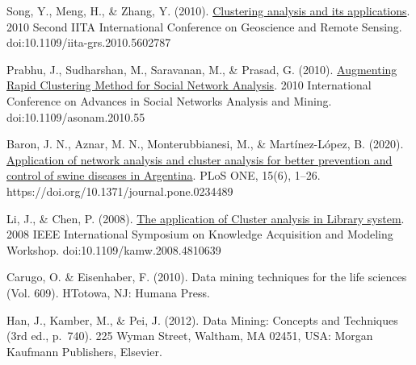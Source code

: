 \documentclass[3p,twocolumn]{elsarticle}
\begin{document}
\begin{thebibliography}{X}
 Song, Y., Meng, H., \& Zhang, Y. (2010). \href{https://ieeexplore.ieee.org/document/5602787} {Clustering analysis and its applications}. 2010 Second IITA International Conference on Geoscience and Remote Sensing. doi:10.1109/iita-grs.2010.5602787

 Prabhu, J., Sudharshan, M., Saravanan, M., \& Prasad, G. (2010). \href{https://ieeexplore.ieee.org/document/5563072} {Augmenting Rapid Clustering Method for Social Network Analysis}. 2010 International Conference on Advances in Social Networks Analysis and Mining. doi:10.1109/asonam.2010.55

 Baron, J. N., Aznar, M. N., Monterubbianesi, M., \& Martínez-López, B. (2020). \href{https://search.ebscohost.com/login.aspx?direct=true&db=aph&AN=143827917&lang=es&site=ehost-live&scope=site} {Application of network analysis and cluster analysis for better prevention and control of swine diseases in Argentina}. PLoS ONE, 15(6), 1–26. https://doi.org/10.1371/journal.pone.0234489

 Li, J., \& Chen, P. (2008). \href{https://ieeexplore.ieee.org/document/4810639} {The application of Cluster analysis in Library system}. 2008 IEEE International Symposium on Knowledge Acquisition and Modeling Workshop. doi:10.1109/kamw.2008.4810639

 Carugo, O. \& Eisenhaber, F. (2010). Data mining techniques for the life sciences (Vol. 609). HTotowa, NJ: Humana Press.
             


Han, J., Kamber, M., \& Pei, J. (2012). Data Mining: Concepts and Techniques (3rd ed., p.~740). 225 Wyman Street, Waltham, MA 02451, USA: Morgan Kaufmann Publishers, Elsevier.

\end{thebibliography}
\end{document}

